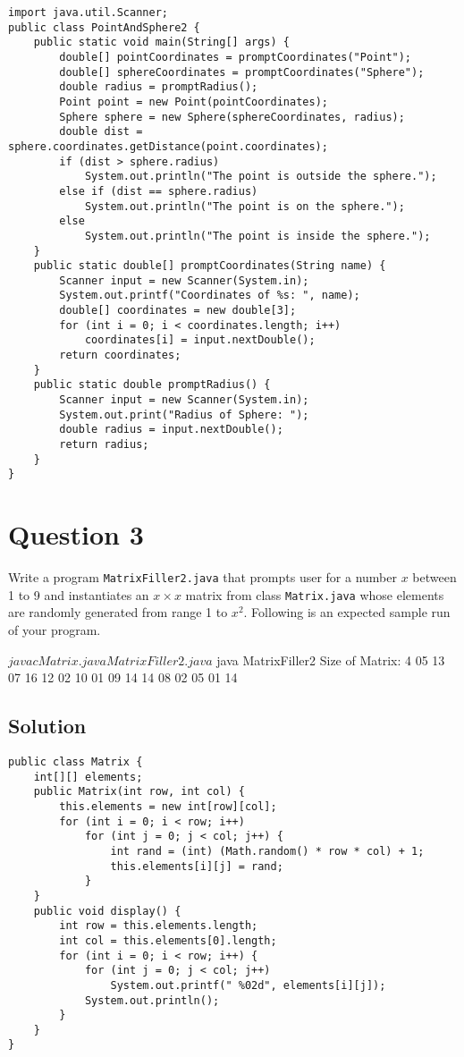 \lstset{language=Java,tabsize=4}
\begin{lstlisting}
import java.util.Scanner;
public class PointAndSphere2 {
	public static void main(String[] args) {
		double[] pointCoordinates = promptCoordinates("Point");
		double[] sphereCoordinates = promptCoordinates("Sphere");
		double radius = promptRadius();
		Point point = new Point(pointCoordinates);
		Sphere sphere = new Sphere(sphereCoordinates, radius);
		double dist = sphere.coordinates.getDistance(point.coordinates);
		if (dist > sphere.radius)
			System.out.println("The point is outside the sphere.");
		else if (dist == sphere.radius)
			System.out.println("The point is on the sphere.");
		else
			System.out.println("The point is inside the sphere.");
	}
	public static double[] promptCoordinates(String name) {
		Scanner input = new Scanner(System.in);
		System.out.printf("Coordinates of %s: ", name);
		double[] coordinates = new double[3];
		for (int i = 0; i < coordinates.length; i++)
			coordinates[i] = input.nextDouble();
		return coordinates;
	}
	public static double promptRadius() {
		Scanner input = new Scanner(System.in);
		System.out.print("Radius of Sphere: ");
		double radius = input.nextDouble();
		return radius;
	}
}
\end{lstlisting}

\section*{Question 3}
Write a program \texttt{MatrixFiller2.java} that prompts user for a number $x$ between 1 to 9 and instantiates an $x \times x$ matrix from class \texttt{Matrix.java} whose elements are randomly generated from range 1 to $x^2$.
Following is an expected sample run of your program.

\begin{terminal}
$ javac Matrix.java MatrixFiller2.java
$ java MatrixFiller2
Size of Matrix: 4
 05 13 07 16
 12 02 10 01
 09 14 14 08
 02 05 01 14
\end{terminal}

\subsection*{Solution}

\lstset{language=Java,tabsize=4}
\begin{lstlisting}
public class Matrix {
	int[][] elements;
	public Matrix(int row, int col) {
		this.elements = new int[row][col];
		for (int i = 0; i < row; i++)
			for (int j = 0; j < col; j++) {
				int rand = (int) (Math.random() * row * col) + 1;
				this.elements[i][j] = rand;
			}
	}
	public void display() {
		int row = this.elements.length;
		int col = this.elements[0].length;
		for (int i = 0; i < row; i++) {
			for (int j = 0; j < col; j++)
				System.out.printf(" %02d", elements[i][j]);
			System.out.println();
		}
	}
}
\end{lstlisting}

